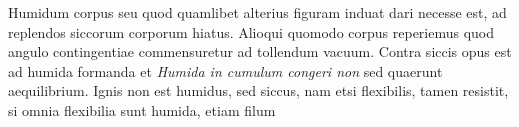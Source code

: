  Humidum corpus seu quod quamlibet alterius figuram induat dari necesse est, ad replendos siccorum corporum hiatus. Alioqui quomodo corpus reperiemus quod angulo contingentiae commensuretur ad tollendum vacuum. Contra siccis opus est ad humida formanda et 
\pend
\pstart {}
\textit{Humida in cumulum congeri non } sed quaerunt aequilibrium.  Ignis non est humidus, sed siccus\protect{}, nam etsi flexibilis, tamen resistit, si omnia flexibilia sunt humida, etiam filum 
\pend 
\count{}
\count{}

